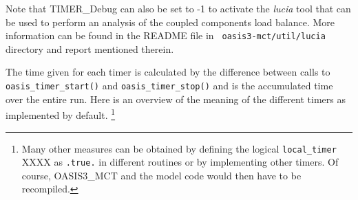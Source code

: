 Note that TIMER\_Debug can also be set to -1 to activate the {\it lucia}
tool that can be used to perform an analysis of the coupled components
load balance. More information can be found in the README file in {\tt
  oasis3-mct/util/lucia} directory and report mentioned therein.
 
The time given for each timer is calculated by the difference between
calls to {\tt oasis\_timer\_start()} and {\tt oasis\_timer\_stop()}
and is the accumulated time over the entire run. Here is an overview
of the meaning of the different timers as implemented by default.
\footnote{Many other measures can be obtained by defining the logical
{\tt local\_timer} XXXX as {\tt .true.} in different routines or by
implementing other timers. Of course, OASIS3\_MCT and the model code
would then have to be recompiled.}

